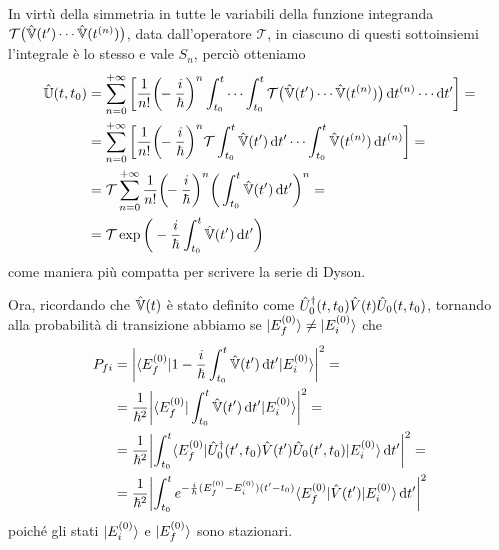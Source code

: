 In virtù della simmetria in tutte le variabili della funzione integranda $\mathcal T\big(\hat{\mathbb V}(t')\cdots\hat{\mathbb V}(t^{(n)})\big)$, data dall'operatore $\mathcal T$, in ciascuno di questi sottoinsiemi l'integrale è lo stesso e vale $S_n$, perciò otteniamo
\begin{equation}
	\begin{split}
		\op{\mathbb U}(t,t_0)
		&=\sum_{n=0}^{+\infty}\bigg[\frac1{n!}\bigg(\!\!-\frac{i}{\hbar}\bigg)^n\int_{t_0}^t\cdots\int_{t_0}^t\mathcal T\big(\op{\mathbb V}(t')\cdots\op{\mathbb V}(t^{(n)})\big)\,\dd t^{(n)}\cdots\dd t'\bigg]=\\
		&=\sum_{n=0}^{+\infty}\bigg[\frac1{n!}\bigg(\!\!-\frac{i}{\hbar}\bigg)^n\mathcal T\int_{t_0}^t\op{\mathbb V}(t')\,\dd t'\cdots\int_{t_0}^t\op{\mathbb V}(t^{(n)})\,\dd t^{(n)}\bigg]=\\
		&=\mathcal T\sum_{n=0}^{+\infty}\frac1{n!}\bigg(\!\!-\frac{i}{\hbar}\bigg)^n\bigg(\int_{t_0}^t\op{\mathbb V}(t')\,\dd t'\bigg)^n=\\
		&=\mathcal T\exp\bigg(-\frac{i}{\hbar}\int_{t_0}^t\op{\mathbb V}(t')\,\dd t'\bigg)
	\end{split}
	\label{eq:serie-dyson-alt}
\end{equation}
come maniera più compatta per scrivere la serie di Dyson.

Ora, ricordando che $\hat{\mathbb V}(t)$ è stato definito come $\hat{U}^\dagger_0(t,t_0)\hat{V}(t)\hat{U}_0(t,t_0)$, tornando alla probabilità di transizione abbiamo se $\lvert E_f^{(0)}\rangle\ne\lvert E_i^{(0)}\rangle$ che
\begin{equation}
	\begin{split}
        P_{fi}&=\abs[\bigg]{\bra{E_f^{(0)}}1-\frac{i}{\hbar}\int_{t_0}^t\op{\mathbb V}(t')\,\dd t'\ket{E_i^{(0)}}}^2=\\
        &=\frac1{\hbar^2}\abs[\bigg]{\bra{E_f^{(0)}}\int_{t_0}^t\op{\mathbb V}(t')\,\dd t'\ket{E_i^{(0)}}}^2=\\
        &=\frac1{\hbar^2}\abs[\bigg]{\int_{t_0}^t\bra{E_f^{(0)}}\adj{\op U}_0(t',t_0)\op V(t')\op U_0(t',t_0)\ket{E_i^{(0)}}\,\dd t'}^2=\\
        &=\frac1{\hbar^2}\abs[\bigg]{\int_{t_0}^te^{-\frac{i}{\hbar}(E_f^{(0)}-E_i^{(0)})(t'-t_0)}\bra{E_f^{(0)}}\op V(t')\ket{E_i^{(0)}}\,\dd t'}^2
	\end{split}
	\label{eq:probabilita-transizione-autostati-dipendente-tempo}
\end{equation}
poich\'e gli stati $\lvert E_i^{(0)}\rangle$ e $\lvert E_f^{(0)}\rangle$ sono stazionari.

